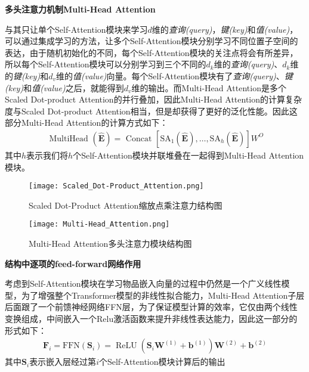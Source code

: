 \textbf{多头注意力机制Multi-Head Attention}

与其只让单个Self-Attention模块来学习$d$维的\textit{查询(query)}，\textit{键(key)}和\textit{值(value)}，可以通过集成学习的方法，让多个Self-Attention模块分别学习不同位置子空间的表达，由于随机初始化的不同，每个Self-Attention模块的关注点将会有所差异，所以每个Self-Attention模块可以分别学习到三个不同的$d_{k}$维的\textit{查询(query)}、$d_{k}$维的\textit{键(key)}和$d_{v}$维的\textit{值(value)}向量。每个Self-Attention模块有了\textit{查询(query)}、\textit{键(key)}和\textit{值(value)}之后，就能得到$d_{v}$维的输出。而Multi-Head Attention是多个Scaled Dot-product Attention的并行叠加，因此Multi-Head Attention的计算复杂度与Scaled Dot-product Attention相当，但是却获得了更好的泛化性能。因此这部分Multi-Head Attention的计算方式如下：
\begin{align} 
	\text { MultiHead }(\widehat{\mathbf{E}}) =\text { Concat }[\mathrm{SA}_{1}(\widehat{\mathbf{E}}), \ldots, \mathrm{SA}_{h}(\widehat{\mathbf{E}})] W^{O}
\end{align}
其中$h$表示我们将$h$个Self-Attention模块并联堆叠在一起得到Multi-Head Attention模块。

\begin{figure}[!htb]
   \begin{minipage}{0.48\textwidth}
     \centering
     \texttt{[image: Scaled\_Dot-Product\_Attention.png]} %
     \caption{Scaled Dot-Product Attention缩放点乘注意力结构图}
     \label{Fig:Scaled_Dot-Product_Attention}
   \end{minipage}\hfill
   \begin {minipage}{0.48\textwidth}
     \centering
     \texttt{[image: Multi-Head\_Attention.png]} %
     \caption{Multi-Head Attention多头注意力模块结构图}
     \label{Fig:Multi-Head_Attention}
   \end{minipage}
\end{figure}

\textbf{结构中逐项的feed-forward网络作用}

考虑到Self-Attention模块在学习物品嵌入向量的过程中仍然是一个广义线性模型，为了增强整个Transformer模型的非线性拟合能力，Multi-Head Attention子层后面跟了一个前馈神经网络FFN层，为了保证模型计算的效率，它仅由两个线性变换组成，中间嵌入一个Relu激活函数来提升非线性表达能力，因此这一部分的形式如下：
\begin{align}
	\mathbf{F}_{i}=\mathrm{FFN}\left(\mathbf{S}_{i}\right)=\operatorname{ReLU}\left(\mathbf{S}_{i} \mathbf{W}^{(1)}+\mathbf{b}^{(1)}\right) \mathbf{W}^{(2)}+\mathbf{b}^{(2)}
\end{align}
其中$\mathbf{S}_{i}$表示嵌入层经过第$i$个Self-Attention模块计算后的输出

